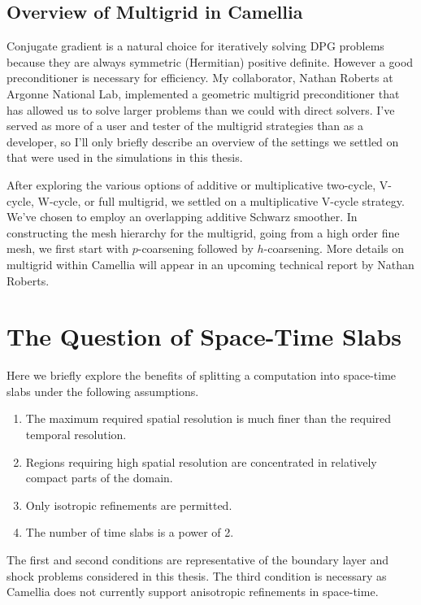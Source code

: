 \documentclass[Dissertation.tex]{subfiles}
\begin{document}
\subsection{Overview of Multigrid in Camellia}
Conjugate gradient is a natural choice for iteratively solving DPG problems because they are always symmetric
(Hermitian) positive definite.
However a good preconditioner is necessary for efficiency.
My collaborator, Nathan Roberts at Argonne National Lab, implemented a geometric multigrid preconditioner
that has allowed us to solve larger problems than we could with direct solvers.
I've served as more of a user and tester of the multigrid strategies than as a developer, so
I'll only briefly describe an overview of the settings we settled on 
that were used in the simulations in this thesis.

After exploring the various options of additive or multiplicative two-cycle, V-cycle, W-cycle, or full multigrid,
we settled on a multiplicative V-cycle strategy.
We've chosen to employ an overlapping additive Schwarz smoother.
In constructing the mesh hierarchy for the multigrid, going from a high order fine mesh, we first start
with $p$-coarsening followed by $h$-coarsening.
More details on multigrid within Camellia will appear in an upcoming technical report by Nathan Roberts.

\section{The Question of Space-Time Slabs}
Here we briefly explore the benefits of splitting a computation into space-time slabs under the following assumptions.
\begin{enumerate}
\item The maximum required spatial resolution is much finer than the required temporal resolution.
\item Regions requiring high spatial resolution are concentrated in relatively compact parts of the domain.
\item Only isotropic refinements are permitted.
\item The number of time slabs is a power of 2.
\end{enumerate}
The first and second conditions are representative of the boundary layer and 
shock problems considered in this thesis.
The third condition is necessary as Camellia does not currently support anisotropic refinements in space-time.
\end{document}
